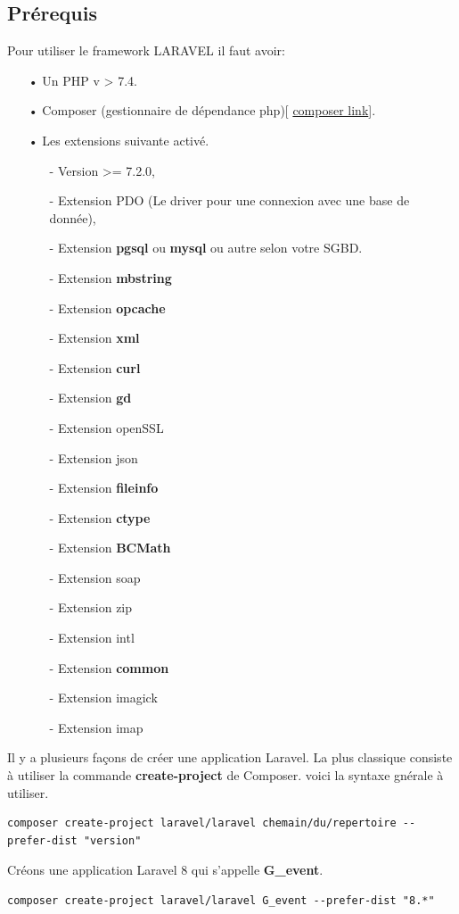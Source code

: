 \documentclass[12pt,a4paper]{article}
\begin{document}
\subsection{Prérequis}
Pour utiliser le framework LARAVEL il faut avoir:
\begin{itemize}
\item[•] Un PHP v > 7.4.
\item[•] Composer (gestionnaire de dépendance php)[ \href{https://getcomposer.org/download/}{composer link}].
\item[•] Les extensions suivante activé.
\begin{itemize}
\item[-] Version >= 7.2.0,
\item[-] Extension PDO (Le driver pour une connexion avec une base de donnée),
\item[-] Extension \textbf{pgsql} ou \textbf{mysql} ou autre selon votre SGBD.
\item[-] Extension \textbf{mbstring}
\item[-] Extension \textbf{opcache}
\item[-] Extension \textbf{xml}
\item[-] Extension \textbf{curl}
\item[-] Extension \textbf{gd}
\item[-] Extension openSSL
\item[-] Extension json
\item[-] Extension \textbf{fileinfo}
\item[-] Extension \textbf{ctype}
\item[-] Extension \textbf{BCMath}
\item[-] Extension soap
\item[-] Extension zip
\item[-] Extension intl
\item[-] Extension \textbf{common}
\item[-] Extension imagick
\item[-] Extension imap
\end{itemize}
\end{itemize}
Il y a plusieurs façons de créer une application Laravel. La plus classique consiste à utiliser la commande 
\textbf{create-project} de Composer. voici la syntaxe gnérale à utiliser.
\begin{verbatim}
composer create-project laravel/laravel chemain/du/repertoire --prefer-dist "version"
\end{verbatim} 
Créons une application Laravel 8 qui s’appelle \textbf{G\_event}.
\begin{verbatim}
composer create-project laravel/laravel G_event --prefer-dist "8.*"
\end{verbatim}
\end{document}
